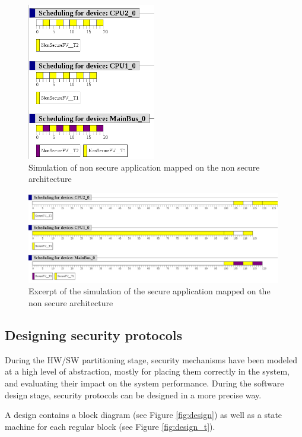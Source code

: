 \documentclass[12pt]{article}
\begin{document}
\begin{figure}[htbp]
\centering
\includegraphics[width=0.5\textwidth]{fig/simu_mapping1}
\caption{Simulation of non secure application mapped on the non secure architecture} \label{fig:simu_mapping1}
\end{figure}

\begin{figure}[htbp]
\centering
\includegraphics[width=0.99\textwidth]{fig/simu_mapping3}
\caption{Excerpt of the simulation of the secure application mapped on the non secure architecture} \label{fig:simu_mapping3}
\end{figure}

\subsection{Designing security protocols}
During the HW/SW partitioning stage, security mechanisms have been modeled at a high level of abstraction, mostly for placing them correctly in the system, and evaluating their impact on the system performance. During the software design stage, security protocols can be designed in a more precise way.

A design contains a block diagram (see Figure \ref{fig:design}) as well as a state machine for each regular block (see Figure \ref{fig:design_t}). 
\end{document}
